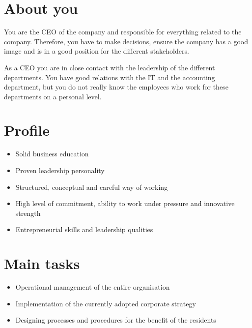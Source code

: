 \section*{About you}
You are the CEO of the company and responsible for everything related to the company. 
Therefore, you have to make decisions, ensure the company has a good image and is in a good position for the different stakeholders.

As a CEO you are in close contact with the leadership of the different departments.
You have good relations with the IT and the accounting department, but you do not really know the employees who work for these departments on a personal level.

\section*{Profile}
\begin{itemize}
    \item Solid business education
    \item Proven leadership personality
    \item Structured, conceptual and careful way of working
    \item High level of commitment, ability to work under pressure and innovative strength
    \item Entrepreneurial skills and leadership qualities
\end{itemize}

\section*{Main tasks}
\begin{itemize}
    \item Operational management of the entire organisation
    \item Implementation of the currently adopted corporate strategy
    \item Designing processes and procedures for the benefit of the residents
\end{itemize}